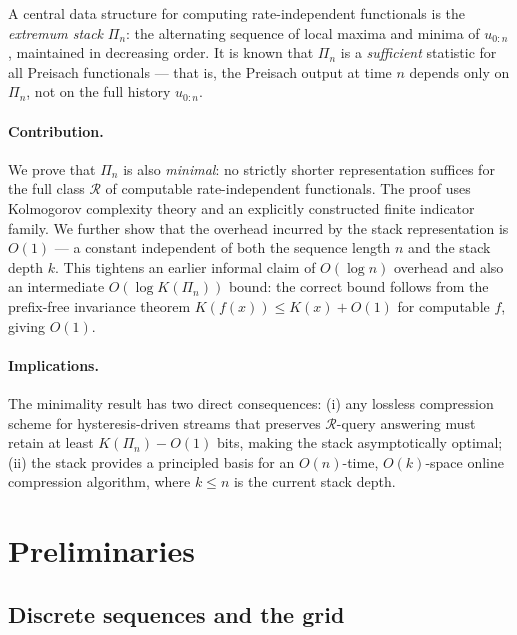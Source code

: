 \documentclass[preprint,12pt]{elsarticle}
\newcommand{\R}{\mathcal{R}}
\newcommand{\stack}{\Pi}
\begin{document}
A central data structure for computing rate-independent functionals
is the \emph{extremum stack} $\stack_n$: the alternating sequence
of local maxima and minima of $u_{0:n}$, maintained in decreasing
order.
It is known that $\stack_n$ is a \emph{sufficient} statistic for
all Preisach functionals \citep{Mayergoyz1991} — that is, the
Preisach output at time $n$ depends only on $\stack_n$, not on
the full history $u_{0:n}$.

\paragraph{Contribution.}
We prove that $\stack_n$ is also \emph{minimal}: no strictly shorter
representation suffices for the full class $\R$ of computable
rate-independent functionals.
The proof uses Kolmogorov complexity theory
\citep{LiVitanyi2008} and an explicitly constructed finite
indicator family.
We further show that the overhead incurred by the stack
representation is $O(1)$ — a constant independent of both the
sequence length $n$ and the stack depth $k$.
This tightens an earlier informal claim of $O(\log n)$ overhead
and also an intermediate $O(\log K(\stack_n))$ bound: the correct
bound follows from the prefix-free invariance theorem
$K(f(x)) \leq K(x) + O(1)$ for computable $f$, giving $O(1)$.

\paragraph{Implications.}
The minimality result has two direct consequences:
(i) any lossless compression scheme for hysteresis-driven streams
that preserves $\R$-query answering must retain at least
$K(\stack_n) - O(1)$ bits, making the stack asymptotically optimal;
(ii) the stack provides a principled basis for an $O(n)$-time,
$O(k)$-space online compression algorithm, where $k \leq n$ is the
current stack depth.

\section{Preliminaries}
\label{sec:prelim}

\subsection{Discrete sequences and the grid}
\end{document}
